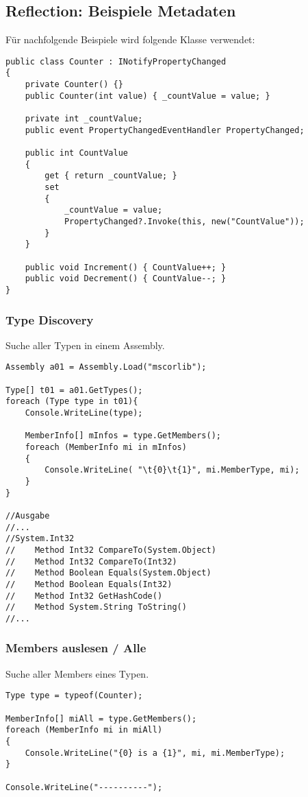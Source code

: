 \begin{multicols*}{2}
\subsection{Reflection: Beispiele Metadaten}
Für nachfolgende Beispiele wird folgende Klasse verwendet:
\begin{lstlisting}
public class Counter : INotifyPropertyChanged
{
    private Counter() {}
    public Counter(int value) { _countValue = value; }

    private int _countValue;
    public event PropertyChangedEventHandler PropertyChanged;

    public int CountValue
    {
        get { return _countValue; }
        set
        {
            _countValue = value;
            PropertyChanged?.Invoke(this, new("CountValue"));
        }
    }

    public void Increment() { CountValue++; }
    public void Decrement() { CountValue--; }
}
\end{lstlisting}
\subsubsection{Type Discovery}
Suche aller Typen in einem Assembly.
\begin{lstlisting}
Assembly a01 = Assembly.Load("mscorlib");

Type[] t01 = a01.GetTypes();
foreach (Type type in t01){
    Console.WriteLine(type);

    MemberInfo[] mInfos = type.GetMembers();
    foreach (MemberInfo mi in mInfos)
    {
        Console.WriteLine( "\t{0}\t{1}", mi.MemberType, mi); 
    }
}

//Ausgabe
//...
//System.Int32
//    Method Int32 CompareTo(System.Object) 
//    Method Int32 CompareTo(Int32)
//    Method Boolean Equals(System.Object) 
//    Method Boolean Equals(Int32)
//    Method Int32 GetHashCode()
//    Method System.String ToString()
//...
\end{lstlisting}
\subsubsection{Members auslesen / Alle}
Suche aller Members eines Typen.
\begin{lstlisting}
Type type = typeof(Counter);

MemberInfo[] miAll = type.GetMembers();
foreach (MemberInfo mi in miAll)
{
    Console.WriteLine("{0} is a {1}", mi, mi.MemberType);
}

Console.WriteLine("----------");


\end{lstlisting}
\end{multicols*}
